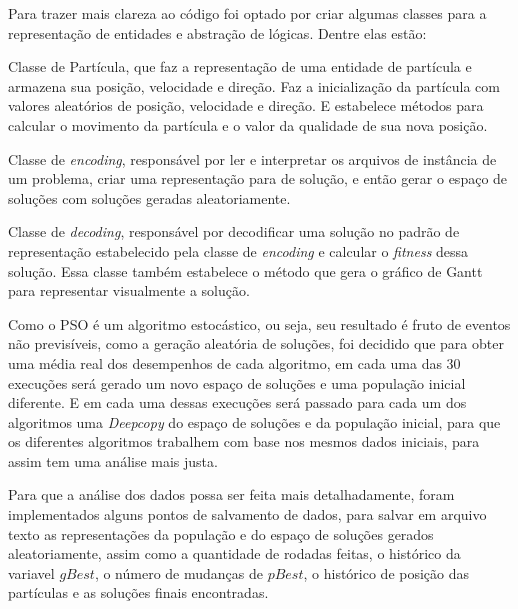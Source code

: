        \hfill\newline
        Para trazer mais clareza ao código foi optado por criar algumas classes para a representação de entidades e abstração de lógicas. Dentre elas estão:\newline
        
        Classe de Partícula, que faz a representação de uma entidade de partícula e armazena sua posição, velocidade e direção. Faz a inicialização da partícula com valores aleatórios de posição, velocidade e direção. E estabelece métodos para calcular o movimento da partícula e o valor da qualidade de sua nova posição.\newline
        
        Classe de \textit{encoding}, responsável por ler e interpretar os arquivos de instância de um problema, criar uma representação para de solução, e então gerar o espaço de soluções com soluções geradas aleatoriamente.\newline
         
        Classe de \textit{decoding}, responsável por decodificar uma solução no padrão de representação estabelecido pela classe de \textit{encoding} e calcular o \textit{fitness} dessa solução. Essa classe também estabelece o método que gera o gráfico de Gantt para representar visualmente a solução.\newline
        

        Como o PSO é um algoritmo estocástico, ou seja, seu resultado é fruto de eventos não previsíveis, como a geração aleatória de soluções, foi decidido que para obter uma média real dos desempenhos de cada algoritmo, em cada uma das 30 execuções será gerado um novo espaço de soluções e uma população inicial diferente.\newline
        E em cada uma dessas execuções será passado para cada um dos algoritmos uma \textit{Deepcopy} do espaço de soluções e da população inicial, para que os diferentes algoritmos trabalhem com base nos mesmos dados iniciais, para assim tem uma análise mais justa.\newline

        Para que a análise dos dados possa ser feita mais detalhadamente, foram implementados alguns pontos de salvamento de dados, para salvar em arquivo texto as representações da população e do espaço de soluções gerados aleatoriamente, assim como a quantidade de rodadas feitas, o histórico da variavel $gBest$, o número de mudanças de $pBest$, o histórico de posição das partículas e as soluções finais encontradas.
    


